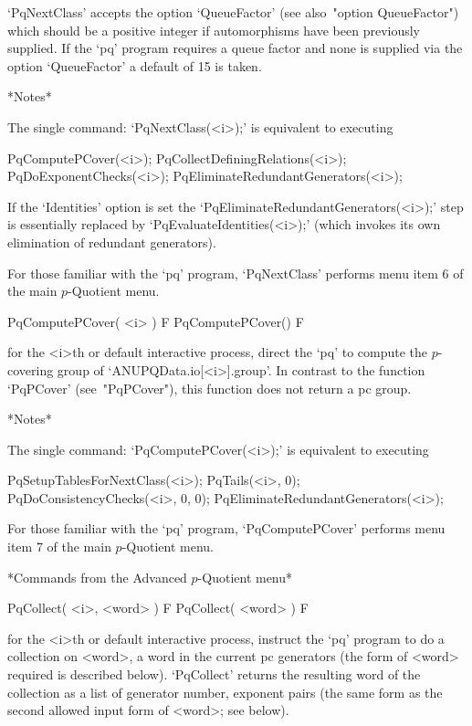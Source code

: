 `PqNextClass'  accepts  the  option   `QueueFactor'   (see   also~"option
QueueFactor") which should be a positive integer  if  automorphisms  have
been previously supplied. If the `pq' program requires a queue factor  and
none is supplied via the option `QueueFactor' a default of 15 is taken.

*Notes*

The single command: `PqNextClass(<i>);' is equivalent to executing

PqComputePCover(<i>);
PqCollectDefiningRelations(<i>);
PqDoExponentChecks(<i>);
PqEliminateRedundantGenerators(<i>);

If the `Identities' option is set the `PqEliminateRedundantGenerators(<i>);'
step is essentially replaced by `PqEvaluateIdentities(<i>);' (which invokes
its own elimination of redundant generators).

For those familiar with the `pq' program, `PqNextClass' performs menu item
6 of the main $p$-Quotient menu.

\>PqComputePCover( <i> ) F
\>PqComputePCover() F

for the <i>th or default interactive {\ANUPQ} process, direct the `pq' to
compute the $p$-covering group of `ANUPQData.io[<i>].group'.  In contrast
to the function  `PqPCover'  (see~"PqPCover"),  this  function  does  not
return a {\GAP} pc group.

*Notes*

The single command: `PqComputePCover(<i>);' is equivalent to executing
\goodbreak%

PqSetupTablesForNextClass(<i>);
PqTails(<i>, 0);
PqDoConsistencyChecks(<i>, 0, 0);
PqEliminateRedundantGenerators(<i>);

For those familiar with the `pq' program, `PqComputePCover' performs  menu
item 7 of the main $p$-Quotient menu.

*Commands from the Advanced $p$-Quotient menu*

\>PqCollect( <i>, <word> ) F
\>PqCollect( <word> ) F

for the <i>th or default interactive {\ANUPQ} process, instruct the  `pq'
program to do a collection on <word>, a word in the current pc generators
(the form of <word> required is described below). `PqCollect' returns the
resulting word of the collection as a list of generator number,  exponent
pairs (the same form as the second allowed  input  form  of  <word>;  see
below).

